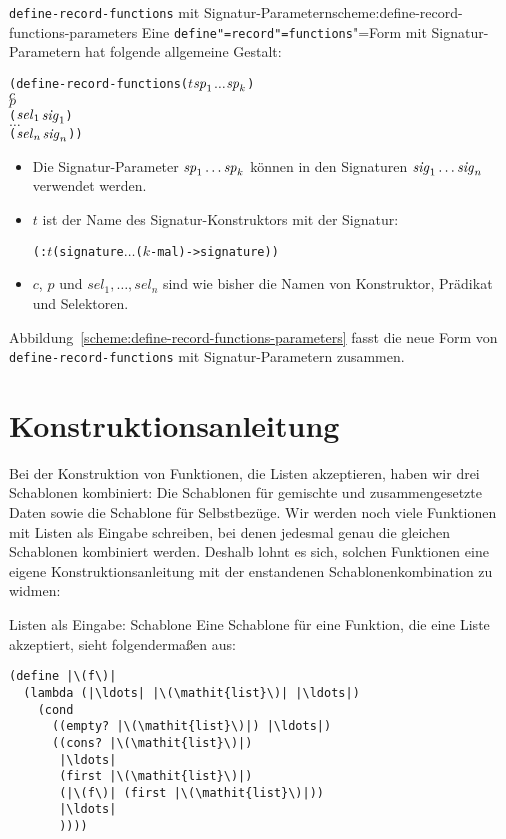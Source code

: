 \begin{feature}{\texttt{define-record-functions} mit Signatur-Parametern}{scheme:define-record-functions-parameters}
Eine \texttt{define"=record"=functions}"=Form
mit Signatur-Parametern hat folgende allgemeine Gestalt:\label{def:define-record-functions-parameters}
%
\begin{alltt}
(define-record-functions (\(t\) \(\mathit{sp}\sb{1}\) \(\ldots\) \(\mathit{sp}\sb{k}\))
  \(c\)
  \(p\)
  (\(\mathit{sel}\sb{1}\) \(\mathit{sig}\sb{1}\))
  \(\ldots\)
  (\(\mathit{sel}\sb{n}\) \(\mathit{sig}\sb{n}\)))
\end{alltt}
%
%
\begin{itemize}
\item Die Signatur-Parameter $\mathit{sp}\sb{1} \ldots \mathit{sp}\sb{k}$
können in den Signaturen
\(\mathit{sig}\sb{1}\ldots\mathit{sig}\sb{n}\) verwendet werden.
\item $t$ ist der Name des Signatur-Konstruktors mit der Signatur:
\begin{alltt}
(: \(t\) (signature \(\ldots\) \textrm{(\(k\)-mal)} -> signature))
\end{alltt}
  \item $c$, $p$ und $\mathit{sel}_1, \ldots, \mathit{sel}_n$ sind wie
    bisher die Namen von Konstruktor, Prädikat und Selektoren.
\end{itemize}
%
\end{feature}

Abbildung~\ref{scheme:define-record-functions-parameters} fasst die
neue Form von \lstinline{define-record-functions} mit
Signatur-Parametern zusammen.

\section{Konstruktionsanleitung}

Bei der Konstruktion von Funktionen, die Listen akzeptieren, haben wir
drei Schablonen kombiniert: Die Schablonen für gemischte und
zusammengesetzte Daten sowie die Schablone für Selbstbezüge.  Wir
werden noch viele Funktionen mit Listen als Eingabe schreiben, bei
denen jedesmal genau die gleichen Schablonen kombiniert werden.
Deshalb lohnt es sich, solchen Funktionen eine eigene
Konstruktionsanleitung mit der enstandenen Schablonenkombination zu widmen:

\begin{konstruktionsanleitung}{Listen als Eingabe: Schablone}
  \label{ka:listen-eingabe-schablone}
Eine Schablone für eine Funktion, die eine Liste akzeptiert, sieht
folgendermaßen aus:
%
\begin{lstlisting}
(define |\(f\)|
  (lambda (|\ldots| |\(\mathit{list}\)| |\ldots|)
    (cond
      ((empty? |\(\mathit{list}\)|) |\ldots|)
      ((cons? |\(\mathit{list}\)|)
       |\ldots|
       (first |\(\mathit{list}\)|)
       (|\(f\)| (first |\(\mathit{list}\)|))
       |\ldots|
       ))))
\end{lstlisting}
  
  
\end{konstruktionsanleitung}


